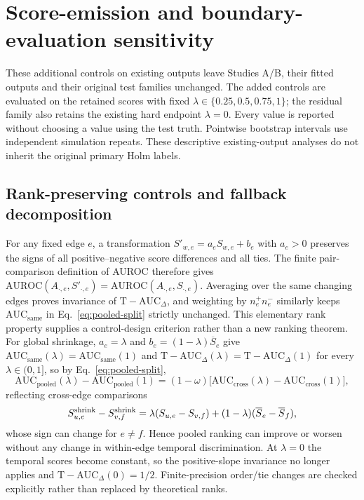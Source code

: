 \documentclass[11pt]{article}
\begin{document}
\FloatBarrier
\section{Score-emission and boundary-evaluation sensitivity}
\label{supp:emission-sensitivity}

\label{app:reviewer-controls}
These additional controls on existing outputs leave Studies A/B, their fitted outputs and their
original test families unchanged. The added controls are evaluated on the
retained scores with fixed $\lambda\in\{0.25,0.5,0.75,1\}$; the residual
family also retains the existing hard endpoint $\lambda=0$. Every value is
reported without choosing a value using the test truth. Pointwise bootstrap
intervals use independent simulation repeats. These descriptive existing-output analyses
do not inherit the original primary Holm labels.

\subsection{Rank-preserving controls and fallback decomposition}
\label{app:rank-preserving-controls}
For any fixed edge $e$, a transformation $S'_{w,e}=a_e S_{w,e}+b_e$ with
$a_e>0$ preserves the signs of all positive--negative score differences and
all ties. The finite pair-comparison definition of AUROC therefore gives
$\mathrm{AUROC}(A_{\cdot,e},S'_{\cdot,e})
=\mathrm{AUROC}(A_{\cdot,e},S_{\cdot,e})$. Averaging over the same changing
edges proves invariance of $\mathrm{T\!-\!AUC}_{\Delta}$, and weighting by
$n_e^+n_e^-$ similarly keeps $\mathrm{AUC}_{\mathrm{same}}$ in Eq.~\eqref{eq:pooled-split}
strictly unchanged. This elementary rank property supplies a control-design
criterion rather than a new ranking theorem. For global shrinkage, $a_e=\lambda$
and $b_e=(1-\lambda)\overline S_e$ give
$\mathrm{AUC}_{\mathrm{same}}(\lambda)=\mathrm{AUC}_{\mathrm{same}}(1)$ and
$\mathrm{T\!-\!AUC}_{\Delta}(\lambda)=\mathrm{T\!-\!AUC}_{\Delta}(1)$ for every
$\lambda\in(0,1]$, so by Eq.~\eqref{eq:pooled-split},
\[
\mathrm{AUC}_{\mathrm{pooled}}(\lambda)-\mathrm{AUC}_{\mathrm{pooled}}(1)
=(1-\omega)\bigl[\mathrm{AUC}_{\mathrm{cross}}(\lambda)-\mathrm{AUC}_{\mathrm{cross}}(1)\bigr],
\]
reflecting cross-edge comparisons
\[
S^{\rm shrink}_{u,e}-S^{\rm shrink}_{v,f}
=\lambda(S_{u,e}-S_{v,f})
+(1-\lambda)(\overline S_e-\overline S_f),
\]
whose sign can change for $e\ne f$. Hence pooled ranking can improve or worsen
without any change in within-edge temporal discrimination. At
$\lambda=0$ the temporal scores become constant, so the positive-slope
invariance no longer applies and $\mathrm{T\!-\!AUC}_{\Delta}(0)=1/2$.
Finite-precision order/tie changes are checked explicitly rather than replaced by
theoretical ranks.
\end{document}
